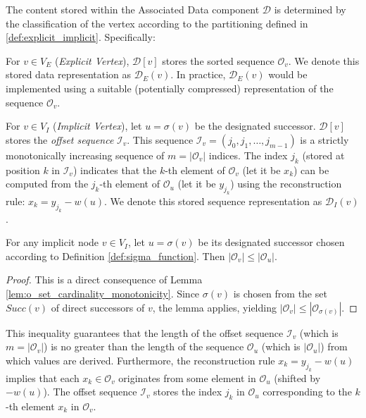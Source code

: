 The content stored within the Associated Data component $\mathcal{D}$ is determined by the classification of the vertex according to the partitioning defined in \ref{def:explicit_implicit}. Specifically:

For $v \in V_E$ (\emph{Explicit Vertex}), $\mathcal{D}[v]$ stores the sorted sequence $\mathcal{O}_v$. We denote this stored data representation as $\mathcal{D}_E(v)$. In practice, $\mathcal{D}_E(v)$ would be implemented using a suitable (potentially compressed) representation of the sequence $\mathcal{O}_v$.

For $v \in V_I$ (\emph{Implicit Vertex}), let $u = \sigma(v)$ be the designated successor. $\mathcal{D}[v]$ stores the \emph{offset sequence} $\mathcal{I}_v$. This sequence $\mathcal{I}_v = (j_0, j_1, \dots, j_{m-1})$ is a strictly monotonically increasing sequence of $m = |\mathcal{O}_v|$ indices. The index $j_k$ (stored at position $k$ in $\mathcal{I}_v$) indicates that the $k$-th element of $\mathcal{O}_v$ (let it be $x_k$) can be computed from the $j_k$-th element of $\mathcal{O}_u$ (let it be $y_{j_k}$) using the reconstruction rule: $x_k = y_{j_k} - w(u)$. We denote this stored sequence representation as $\mathcal{D}_I(v)$.


\begin{proposition}
    \label{prop:o_set_size_guarantee}
    For any implicit node $v \in V_I$, let $u = \sigma(v)$ be its designated successor chosen according to Definition \ref{def:sigma_function}. Then $|\mathcal{O}_v| \le |\mathcal{O}_u|$.
\end{proposition}
\begin{proof}
    This is a direct consequence of Lemma \ref{lem:o_set_cardinality_monotonicity}. Since $\sigma(v)$ is chosen from the set $Succ(v)$ of direct successors of $v$, the lemma applies, yielding $|\mathcal{O}_v| \le |\mathcal{O}_{\sigma(v)}|$.
\end{proof}
This inequality guarantees that the length of the offset sequence $\mathcal{I}_v$ (which is $m = |\mathcal{O}_v|$) is no greater than the length of the sequence $\mathcal{O}_u$ (which is $|\mathcal{O}_u|$) from which values are derived. Furthermore, the reconstruction rule $x_k = y_{j_k} - w(u)$ implies that each $x_k \in \mathcal{O}_v$ originates from some element in $\mathcal{O}_u$ (shifted by $-w(u)$). The offset sequence $\mathcal{I}_v$ stores the index $j_k$ in $\mathcal{O}_u$ corresponding to the $k$-th element $x_k$ in $\mathcal{O}_v$.

